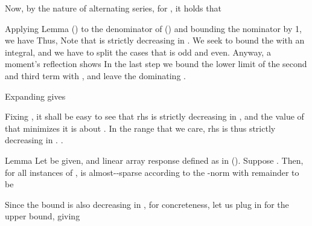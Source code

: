 Now, by the nature of alternating series, for , it holds that

Applying Lemma () to the denominator of () and bounding the nominator by 1, we have
Thus,
Note that  is strictly decreasing in .
We seek to bound the  with an integral, and we have to split the cases that  is odd and even.
Anyway, a moment's reflection shows
In the last step we bound the lower limit of the second and third term with , and leave the dominating .

Expanding  gives

Fixing , it shall be easy to see that rhs is strictly decreasing in , and the value of  that minimizes it is about .
In the range that we care, rhs is thus strictly decreasing in .
.

\Result
{Lemma}
{
Let  be given, and linear array response  defined as in ().
Suppose .
Then, for all instances of \m {\f},  is almost--sparse according to the -norm with remainder  to be
}

Since the bound is also decreasing in , for concreteness, let us plug in  for the upper bound, giving

\stopsubsection

\startsubsection [title={Norm of Angular Channel Response}]

